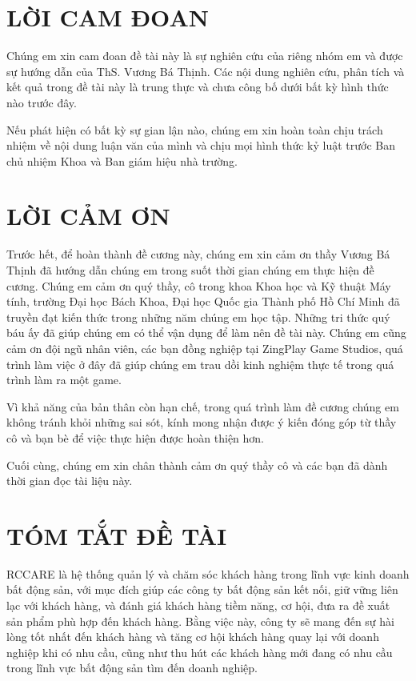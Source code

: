 \documentclass[12pt,a4paper]{article}
\begin{document}
    \restoregeometry

    \newpage
    \section*{\centering LỜI CAM ĐOAN}
    Chúng em xin cam đoan đề tài này là sự nghiên cứu của riêng nhóm em và được sự hướng dẫn của ThS. Vương Bá Thịnh. Các nội dung nghiên cứu, phân tích và kết quả trong đề tài này là trung thực và chưa công bố dưới bất kỳ hình thức nào trước đây.

    Nếu phát hiện có bất kỳ sự gian lận nào, chúng em xin hoàn toàn chịu trách nhiệm về nội dung luận văn của mình và chịu mọi hình thức kỷ luật trước Ban chủ nhiệm Khoa và Ban giám hiệu nhà trường.

    \newpage
    \section*{\centering LỜI CẢM ƠN}
    Trước hết, để hoàn thành đề cương này, chúng em xin cảm ơn thầy Vương Bá Thịnh đã hướng dẫn chúng em trong suốt thời gian chúng em thực hiện đề cương. Chúng em cảm ơn quý thầy, cô trong khoa Khoa học và Kỹ thuật Máy tính, trường Đại học Bách Khoa, Đại học Quốc gia Thành phố Hồ Chí Minh đã truyền đạt kiến thức trong những năm chúng em học tập. Những tri thức quý báu ấy đã giúp chúng em có thể vận dụng để làm nên đề tài này. Chúng em cũng cảm ơn đội ngũ nhân viên, các bạn đồng nghiệp tại ZingPlay Game Studios, quá trình làm việc ở đây đã giúp chúng em trau dồi kinh nghiệm thực tế trong quá trình làm ra một game.

    Vì khả năng của bản thân còn hạn chế, trong quá trình làm đề cương chúng em không tránh khỏi những sai sót, kính mong nhận được ý kiến đóng góp từ thầy cô và bạn bè để việc thực hiện được hoàn thiện hơn.

    Cuối cùng, chúng em xin chân thành cảm ơn quý thầy cô và các bạn đã dành thời gian đọc tài liệu này.

    \newpage
    \section*{\centering TÓM TẮT ĐỀ TÀI}
    RCCARE là hệ thống quản lý và chăm sóc khách hàng trong lĩnh vực kinh doanh bất động sản, với mục đích giúp các công ty bất động sản kết nối, giữ vững liên lạc với khách hàng, và đánh giá khách hàng tiềm năng, cơ hội, đưa ra đề xuất sản phẩm phù hợp đến khách hàng. Bằng việc này, công ty sẽ mang đến sự hài lòng tốt nhất đến khách hàng và tăng cơ hội khách hàng quay lại với doanh nghiệp khi có nhu cầu, cũng như thu hút các khách hàng mới đang có nhu cầu trong lĩnh vực bất động sản tìm đến doanh nghiệp.
\end{document}
